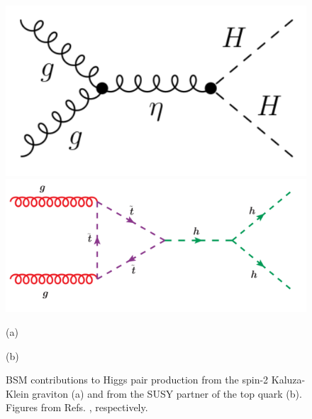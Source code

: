 \begin{figure}
	\centering
	\begin{minipage}{.5\textwidth}
		\centering
		\includegraphics[trim={0cm 0cm 0cm 0cm},clip,width=.7\linewidth]{./Figures/graviton.png}
	\end{minipage}%
	\begin{minipage}{.5\textwidth}
		\centering
		\includegraphics[trim={0cm .5cm 0cm 0cm},clip,width=\linewidth]{./Figures/susy.png}
	\end{minipage}
	\begin{minipage}[t]{0.5\textwidth}
		\caption*{(a)}
	\end{minipage}%
	\hfill
	\begin{minipage}[t]{0.5\textwidth}
		\caption*{(b)}
	\end{minipage}
	\caption{BSM contributions to Higgs pair production from the spin-2 Kaluza-Klein graviton (a) and from the SUSY partner of the top quark (b). Figures from Refs. \cite{hhBSMgrav,hhBSMsusy}, respectively.}
	\label{fig:BSM_diag}
\end{figure}


